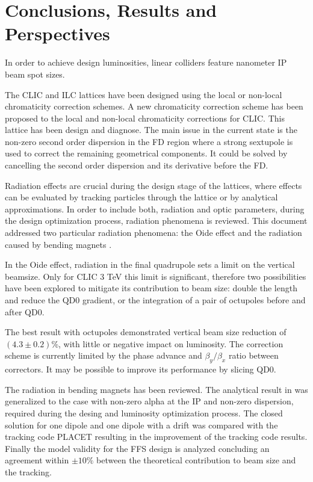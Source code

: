 \chapter*{Conclusions, Results and Perspectives}
In order to achieve design luminosities, linear colliders feature nanometer IP beam spot sizes.\par
The CLIC and ILC lattices have been designed using the local or non-local chromaticity correction schemes. A new chromaticity correction scheme has been proposed to the local and non-local chromaticity corrections for CLIC. This lattice has been design and diagnose. The main issue in the current state is the non-zero second order dispersion in the FD region where a strong sextupole is used to correct the remaining geometrical components. It could be solved by cancelling the second order dispersion and its derivative before the FD.\par
Radiation effects are crucial during the design stage of the lattices, where effects can be evaluated by tracking particles through the lattice or by analytical approximations.
In order to include both, radiation and optic parameters, during the design optimization process, radiation phenomena is reviewed. This document addressed two particular radiation phenomena: the Oide effect \cite{Oide} and the radiation caused by bending magnets \cite{Sands}.\par
In the Oide effect, radiation in the final quadrupole sets a limit on the vertical beamsize. Only for CLIC 3 TeV this limit is significant, therefore two possibilities have been explored to mitigate its contribution to beam size: double the length and reduce the QD0 gradient, or the integration of a pair of octupoles before and after QD0.\par
The best result with octupoles demonstrated vertical beam size reduction of $(4.3\pm0.2)$\%, with little or negative impact on luminosity. The correction scheme is currently limited by the phase advance and $\beta_y/\beta_x$ ratio between correctors. It may be possible to improve its performance by slicing QD0.\par
The radiation in bending magnets has been reviewed. The analytical result in \cite{Sands} was generalized to the case with non-zero alpha at the IP and non-zero dispersion, required during the desing and luminosity optimization process. The closed solution for one dipole and one dipole with a drift was compared with the tracking code PLACET \cite{Placet} resulting in the improvement of the tracking code results. Finally the model validity for the FFS design is analyzed concluding an agreement within $\pm10\%$ between the theoretical contribution to beam size and the tracking.\par

